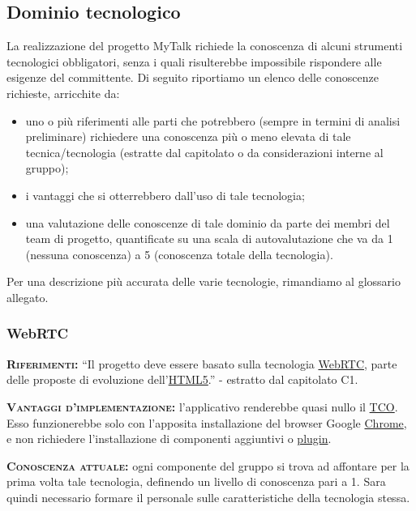 \subsection{Dominio tecnologico}
La realizzazione del progetto MyTalk richiede la conoscenza di alcuni strumenti tecnologici obbligatori, senza i quali risulterebbe impossibile rispondere alle esigenze del committente. Di seguito riportiamo un elenco delle conoscenze richieste, arricchite da:

\begin{itemize}
	\item uno o più riferimenti alle parti che potrebbero (sempre in termini di analisi preliminare) richiedere una conoscenza più o meno elevata di tale tecnica/tecnologia (estratte dal capitolato o da considerazioni interne al gruppo);
	\item i vantaggi che si otterrebbero dall'uso di tale tecnologia;
	\item una valutazione delle conoscenze di tale dominio da parte dei membri del team di progetto, quantificate su una scala di autovalutazione che va da 1 (nessuna conoscenza) a 5 (conoscenza totale della tecnologia).
\end{itemize}
Per una descrizione più accurata delle varie tecnologie, rimandiamo al glossario allegato.

\subsubsection{WebRTC}
\begin{description}
	\item{\scshape\bfseries Riferimenti:} ``Il progetto deve essere basato sulla tecnologia \underline{WebRTC}, parte delle proposte di evoluzione dell'\underline{HTML5}.'' - estratto dal capitolato C1.

	\item{\scshape\bfseries Vantaggi d'implementazione:} l'applicativo renderebbe quasi nullo il \underline{TCO}. Esso funzionerebbe solo con l'apposita installazione del browser Google \underline{Chrome}, e non richiedere l'installazione di componenti aggiuntivi o \underline{plugin}.
	
	\item{\scshape\bfseries Conoscenza attuale:} ogni componente del gruppo si trova ad affontare per la prima volta tale tecnologia, definendo un livello di conoscenza pari a 1. Sara quindi necessario formare il personale sulle caratteristiche della tecnologia stessa.
\end{description}

